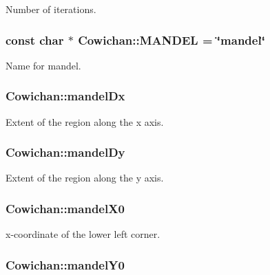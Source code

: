 Number of iterations. \hypertarget{class_cowichan_40d3f57ec83c7c1ec3af94c37d849049}{
\subsubsection[{MANDEL}]{\setlength{\rightskip}{0pt plus 5cm}const char $\ast$ {\bf Cowichan::MANDEL} = \char`\"{}mandel\char`\"{}}}
\label{class_cowichan_40d3f57ec83c7c1ec3af94c37d849049}


Name for mandel. \hypertarget{class_cowichan_edde2560c73a48dd44ea52c6a42c8649}{
\subsubsection[{mandelDx}]{ {\bf Cowichan::mandelDx}}}
\label{class_cowichan_edde2560c73a48dd44ea52c6a42c8649}


Extent of the region along the x axis. \hypertarget{class_cowichan_7189d7127e740a2e6b14dcf0e757a500}{
\subsubsection[{mandelDy}]{ {\bf Cowichan::mandelDy}}}
\label{class_cowichan_7189d7127e740a2e6b14dcf0e757a500}


Extent of the region along the y axis. \hypertarget{class_cowichan_f0bab1165abe53fea17e65764d247786}{
\subsubsection[{mandelX0}]{ {\bf Cowichan::mandelX0}}}
\label{class_cowichan_f0bab1165abe53fea17e65764d247786}


x-coordinate of the lower left corner. \hypertarget{class_cowichan_7b5e0e4e2026c78a6ec45fe306e5af93}{
\subsubsection[{mandelY0}]{ {\bf Cowichan::mandelY0}}}
\label{class_cowichan_7b5e0e4e2026c78a6ec45fe306e5af93}


